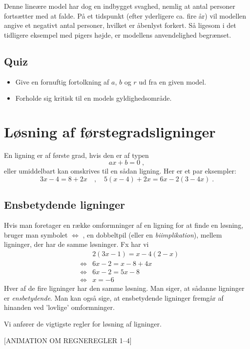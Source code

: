 \documentclass[12pt,oneside,a4paper]{article}
\newcommand{\bas}{\begin{eqnarray*}}
\newcommand{\eas}{\end{eqnarray*}}
\begin{document}
Denne lineære model har dog en indbygget svaghed, nemlig at antal personer
fortsætter med at falde.  På et tidspunkt (efter yderligere ca. fire år) vil
modellen angive et negativt antal personer, hvilket er åbenlyst forkert. Så
\mbox{ligesom} i det tidligere eksempel med pigers højde, er modellens
anvendelighed begrænset.

\subsection{Quiz}
\begin{itemize}
    \item Give en fornuftig fortolkning af $a$, $b$ og $r$ ud fra en given
        model.
    \item Forholde sig kritisk til en models gyldighedsområde.
\end{itemize}


\section{Løsning af førstegradsligninger}
En ligning er af første grad, hvis den er af typen
$$
ax + b = 0\; ,
$$
eller umiddelbart kan omskrives til en sådan ligning. Her er et par eksempler:
$$
3x - 4 = 8 + 2x \quad , \quad 5(x - 4) + 2x = 6x - 2(3 - 4x)\; .
$$

\subsection{Ensbetydende ligninger}
Hvis man foretager en række omformninger af en ligning for at finde en løsning,
bruger man symbolet $\Leftrightarrow$ , en dobbeltpil (eller en {\em
biimplikation}), mellem ligninger, der har de samme løsninger. Fx har vi
\bas
&& 2(3x - 1) = x - 4(2 - x)\\
&\Leftrightarrow& 6x - 2 = x - 8 + 4x\\
&\Leftrightarrow& 6x - 2 = 5x - 8 \\
&\Leftrightarrow& x = -6 
\eas
Hver af de fire ligninger har den samme løsning. Man siger, at sådanne
ligninger er {\em ensbetydende}. Man kan også sige, at ensbetydende ligninger
fremgår af hinanden ved ’lovlige’ omformninger.

Vi anfører de vigtigste regler for løsning af ligninger.

[ANIMATION OM REGNEREGLER 1--4]
\end{document}
